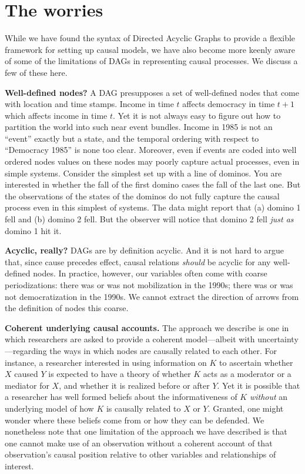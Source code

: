 \documentclass[
  12pt,
]{book}
\begin{document}
\hypertarget{the-worries}{%
\section{The worries}\label{the-worries}}

While we have found the syntax of Directed Acyclic Graphs to provide a flexible framework for setting up causal models, we have also become more keenly aware of some of the limitations of DAGs in representing causal processes. We discuss a few of these here.

\textbf{Well-defined nodes?} A DAG presupposes a set of well-defined nodes that come with location and time stamps. Income in time \(t\) affects democracy in time \(t+1\) which affects income in time \(t\). Yet it is not always easy to figure out how to partition the world into such near event bundles. Income in 1985 is not an ``event'' exactly but a state, and the temporal ordering with respect to ``Democracy 1985'' is none too clear. Moreover, even if events are coded into well ordered nodes values on these nodes may poorly capture actual processes, even in simple systems. Consider the simplest set up with a line of dominos. You are interested in whether the fall of the first domino cases the fall of the last one. But the observations of the states of the dominos do not fully capture the causal process even in this simplest of systems. The data might report that (a) domino 1 fell and (b) domino 2 fell. But the observer will notice that domino 2 fell \emph{just as} domino 1 hit it.

\textbf{Acyclic, really?} DAGs are by definition acyclic. And it is not hard to argue that, since cause precedes effect, causal relations \emph{should} be acyclic for any well-defined nodes. In practice, however, our variables often come with coarse periodizations: there was or was not mobilization in the 1990s; there was or was not democratization in the 1990s. We cannot extract the direction of arrows from the definition of nodes this coarse.

\textbf{Coherent underlying causal accounts.} The approach we describe is one in which researchers are asked to provide a coherent model---albeit with uncertainty---regarding the ways in which nodes are causally related to each other. For instance, a researcher interested in using information on \(K\) to ascertain whether \(X\) caused \(Y\) is expected to have a theory of whether \(K\) acts as a moderator or a mediator for \(X\), and whether it is realized before or after \(Y\). Yet it is possible that a researcher has well formed beliefs about the informativeness of \(K\) \emph{without} an underlying model of how \(K\) is causally related to \(X\) or \(Y\). Granted, one might wonder where these beliefs come from or how they can be defended. We nonetheless note that one limitation of the approach we have described is that one cannot make use of an observation without a coherent account of that observation's causal position relative to other variables and relationships of interest.
\end{document}
